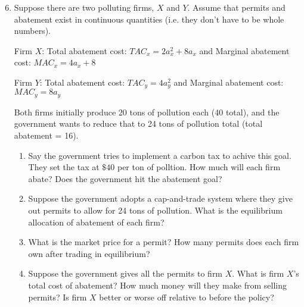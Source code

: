 \documentclass[11pt]{article}
\newcommand{\answer}[1]{\iftoggle{INCLUDEANSWERS}{{\color{violet!70!white}\textbf{Solution:} #1}}{} }
\newcommand{\points}[1]{\iftoggle{INCLUDEPOINTS}{{\color{blue!70!white}(#1 pts.)}}{}}
\begin{document}
\begin{enumerate}
  \setcounter{enumi}{5}
  \item \points{30}  Suppose there are two polluting firms, $X$ and $Y$. Assume that permits and abatement exist in continuous quantities (i.e. they don't have to be whole numbers).

  Firm $X$: Total abatement cost: $TAC_x = 2a_x^2 + 8a_x$ and Marginal abatement cost: $MAC_x = 4a_x + 8$

  Firm $Y$: Total abatement cost: $TAC_y = 4a_y^2$ and Marginal abatement cost: $MAC_y = 8a_y$
  
  Both firms initially produce 20 tons of pollution each (40 total), and the government wants to reduce that to 24 tons of pollution total (total abatement = 16).

  \begin{enumerate}
    \item \points{10} Say the government tries to implement a carbon tax to achive this goal. They set the tax at $\$40$ per ton of polltion. How much will each firm abate? Does the government hit the abatement goal?
    
    \item \points{10} Suppose the government adopts a cap-and-trade system where they give out permits to allow for 24 tons of pollution. What is the equilibrium allocation of abatement of each firm? 

    \item \points{5} What is the market price for a permit? How many permits does each firm own after trading in equilibrium?

    \item \points{5} Suppose the government gives all the permits to firm $X$. What is firm $X$'s total cost of abatement? How much money will they make from selling permits? Is firm $X$ better or worse off relative to before the policy?
  \end{enumerate}
 
  \answer{
    \begin{enumerate}
      \item Each firm will abate until $MAC_x(a_x^*) = \$36$ and $MAC_y(a_y^*) = \$36$. This gives $a_x^* = 8$ and $a_y^* = 5$. They do not hit the goal since they only abate 13 units of pollution total.
      
      \item $4a_x + 8 = 8a_y$ and $a_x + a_y = 16$ implies $a_x^* = 10$ and $a_y^* = 6$. 
      

\end{enumerate}}
\end{enumerate}
\end{document}
